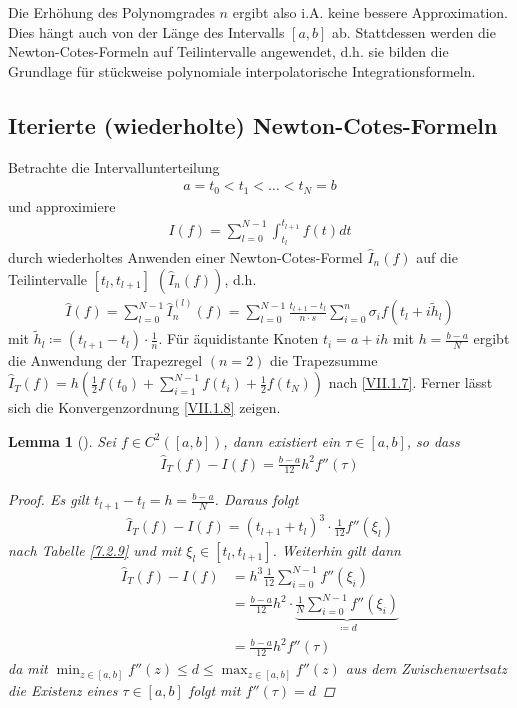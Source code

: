 \documentclass[ngerman,fontsize=11pt, paper=a4, parskip=half, titlepage=true, toc=bib]{scrbook}
\theoremstyle{definition}
\theoremstyle{plain}
\newtheorem{Lem}[Def]{Lemma}		%
\newcommand{\subsectione}[1]{\addtocounter{Def}{1}\subsection{#1}}
\newenvironment{Leme}[1][]{ %
  \begin{Lem}[#1] }
  {\end{Lem}
  \addtocounter{subsection}{1}}
\begin{document}
Die Erhöhung des Polynomgrades $n$
ergibt also
i.A. keine bessere Approximation.
Dies hängt auch von der Länge des
Intervalls $[a,b]$ ab.
Stattdessen werden die
Newton-Cotes-Formeln auf
Teilintervalle angewendet, 
d.h. sie bilden die Grundlage für
stückweise polynomiale
interpolatorische Integrationsformeln.

\subsectione{Iterierte (wiederholte)
  Newton-Cotes-Formeln}
Betrachte die Intervallunterteilung
\begin{gather*}
  a=t_0<t_1<\ldots<t_N=b
\end{gather*}
und approximiere
\begin{gather*}
  I(f) = \sum_{l=0}^{N-1}\int_{t_l}^{t_{l+1}}f(t)dt
\end{gather*}
durch wiederholtes Anwenden einer Newton-Cotes-Formel
$\hat{I}_n(f)$ auf die Teilintervalle $[t_l, t_{l+1}]$
$(\hat{I}_n(f))$,
d.h.
\begin{gather}
  \hat{I}(f) = \sum_{l=0}^{N-1}\hat{I}_n^{(l)}(f)
  = \sum_{l=0}^{N-1}\frac{t_{l+1}-t_l}{n\cdot s}
  \sum_{i=0}^n \sigma_i f(t_l+i\widetilde{h}_l)
\label{VII.2.11}
\end{gather}
mit $\widetilde{h}_l\coloneqq (t_{l+1}-t_l)\cdot \frac{1}{n}$.
Für äquidistante Knoten $t_i=a+ih$ mit $h=\frac{b-a}{N}$
ergibt die Anwendung der Trapezregel $(n=2)$
die Trapezsumme 
$\hat{I}_T(f) = h\left(
  \frac{1}{2}f(t_0)+\sum_{i=1}^{N-1}f(t_i) +\frac{1}{2}f(t_N)
\right)$
nach \eqref{VII.1.7}. 
Ferner lässt sich die Konvergenzordnung \eqref{VII.1.8} zeigen.


\begin{Leme}\label{7.2.11}
  Sei $f\in C^2([a,b])$, dann existiert ein $\tau \in[a,b]$, so dass
\begin{gather}
  \hat{I}_T(f) -I(f) = \frac{b-a}{12}h^2 f''(\tau) %
\label{VII.2.12}
\end{gather}

\begin{proof}
  Es gilt $t_{l+1}-t_l = h= \frac{b-a}{N}$.
Daraus folgt
\begin{gather*}
  \hat{I}_T(f)-I(f)=(t_{l+1}+t_l)^3\cdot\frac{1}{12}f''(\xi_l)
\end{gather*}
nach Tabelle \ref{7.2.9} und mit
$\xi_l\in[t_l,t_{l+1}]$.
Weiterhin gilt dann
\begin{align*}
  \hat{I}_T(f) - I(f) &= h^3\frac{1}{12}\sum_{i=0}^{N-1}f''(\xi_i)\\
                      &= \frac{b-a}{12}h^2 \cdot \underbrace{
                        \frac{1}{N}\sum_{i=0}^{N-1}f''(\xi_i)
                        }_{\coloneqq d}\\
                      &= \frac{b-a}{12}h^2 f''(\tau)
\end{align*}
da mit $\min_{z\in[a,b]} f''(z) \leq d \leq \max_{z\in[a,b]}f''(z)$
aus dem Zwischenwertsatz die Existenz eines $\tau\in[a,b]$ folgt
mit $f''(\tau) = d$
\end{proof}
\end{Leme}
\end{document}

